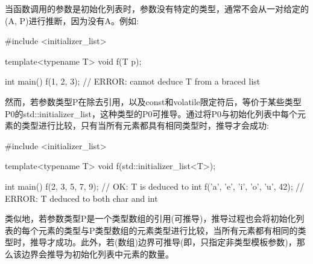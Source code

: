 当函数调用的参数是初始化列表时，参数没有特定的类型，通常不会从一对给定的(A, P)进行推断，因为没有A。例如:

\begin{cpp}
#include <initializer_list>

template<typename T> void f(T p);

int main() {
	f({1, 2, 3}); // ERROR: cannot deduce T from a braced list
}
\end{cpp}

然而，若参数类型P在除去引用，以及const和volatile限定符后，等价于某些类型P0的std::initializer\_list，这种类型的P0可推导。通过将P0与初始化列表中每个元素的类型进行比较，只有当所有元素都具有相同类型时，推导才会成功:

\begin{cpp}
#include <initializer_list>

template<typename T> void f(std::initializer_list<T>);

int main()
{
	f({2, 3, 5, 7, 9}); // OK: T is deduced to int
	f({’a’, ’e’, ’i’, ’o’, ’u’, 42}); // ERROR: T deduced to both char and int
}
\end{cpp}

类似地，若参数类型P是一个类型数组的引用(可推导)，推导过程也会将初始化列表的每个元素的类型与P类型数组的元素类型进行比较，当所有元素都有相同的类型时，推导才成功。此外，若(数组)边界可推导(即，只指定非类型模板参数)，那么该边界会推导为初始化列表中元素的数量。












































